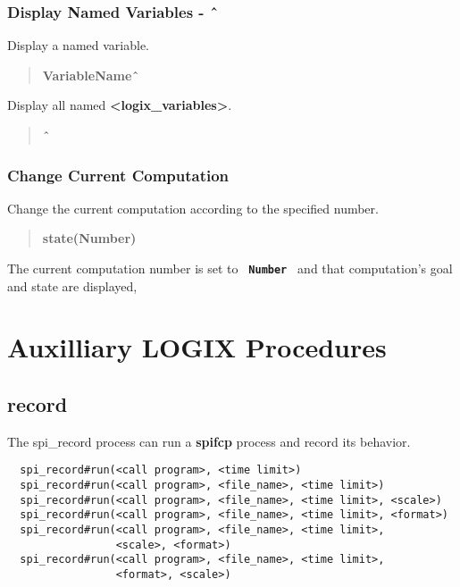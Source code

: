 \documentclass[twoside,10pt]{report}
\begin{document}
\subsection{Display Named Variables - \^\ }

Display a named variable.

\begin{verse}
 {\bfseries
    VariableName\^\ 
 }
\end{verse}

\noindent
Display all named {\bf <logix\_variables>}.

\begin{verse}
 {\bfseries
    \^\ 
 }
\end{verse}

\subsection{Change Current Computation  }

Change the current computation according to the specified number.

\begin{verse}
 {\bfseries
    state(Number) 
 }
\end{verse}

The current computation number is set to {\bf \verb+ Number +} and
that computation's goal and state are displayed,

\chapter{Auxilliary {\bf LOGIX} Procedures}
\label{auxilliary}

\section{record}
\label{record}

The spi\_record process can run a {\bf spifcp} process
and record its behavior.

\begin{verbatim}
  spi_record#run(<call program>, <time limit>)
  spi_record#run(<call program>, <file_name>, <time limit>)
  spi_record#run(<call program>, <file_name>, <time limit>, <scale>)
  spi_record#run(<call program>, <file_name>, <time limit>, <format>)
  spi_record#run(<call program>, <file_name>, <time limit>,
                 <scale>, <format>)
  spi_record#run(<call program>, <file_name>, <time limit>,
                 <format>, <scale>)
\end{verbatim}
\end{document}
